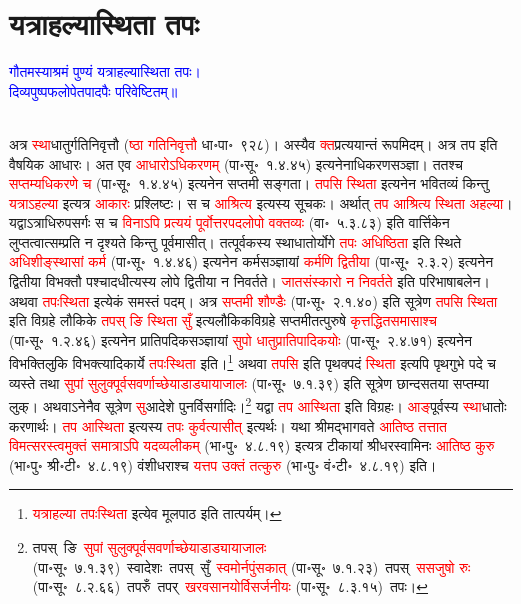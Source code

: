 \section[यत्राहल्यास्थिता तपः]{यत्राहल्यास्थिता तपः}
\centering\textcolor{blue}{गौतमस्याश्रमं पुण्यं यत्राहल्यास्थिता तपः।\nopagebreak\\
दिव्यपुष्पफलोपेतपादपैः परिवेष्टितम्॥}\nopagebreak\\
\\
\begin{sloppypar}\justifying\noindent\hspace{10mm} अत्र \textcolor{red}{स्था}\-धातुर्गति\-निवृत्तौ (\textcolor{red}{ष्ठा गति\-निवृत्तौ} धा॰पा॰~९२८)। अस्यैव \textcolor{red}{क्त}\-प्रत्ययान्तं रूपमिदम्। अत्र तप इति वैषयिक आधारः। अत एव \textcolor{red}{आधारोऽधिकरणम्‌} (पा॰सू॰~१.४.४५) इत्यनेनाधिकरण\-सञ्ज्ञा। ततश्च \textcolor{red}{सप्तम्यधिकरणे च} (पा॰सू॰~१.४.४५) इत्यनेन सप्तमी सङ्गता। \textcolor{red}{तपसि स्थिता} इत्यनेन भवितव्यं किन्तु \textcolor{red}{यत्राऽहल्या} इत्यत्र \textcolor{red}{आकारः} प्रश्लिष्टः। स च \textcolor{red}{आश्रित्य} इत्यस्य सूचकः। अर्थात् \textcolor{red}{तप आश्रित्य स्थिता अहल्या}। यद्वाऽत्राधिरुपसर्गः स च \textcolor{red}{विनाऽपि प्रत्ययं पूर्वोत्तर\-पद\-लोपो वक्तव्यः} (वा॰~५.३.८३) इति वार्त्तिकेन लुप्तत्वात्सम्प्रति न दृश्यते किन्तु पूर्वमासीत्। तत्पूर्वकस्य स्था\-धातोर्योगे \textcolor{red}{तपः अधिष्ठिता} इति स्थिते \textcolor{red}{अधिशीङ्स्थासां कर्म} (पा॰सू॰~१.४.४६) इत्यनेन कर्म\-सञ्ज्ञायां \textcolor{red}{कर्मणि द्वितीया} (पा॰सू॰~२.३.२) इत्यनेन द्वितीया विभक्तौ पश्चादधीत्यस्य लोपे द्वितीया न निवर्तते। \textcolor{red}{जात\-संस्कारो न निवर्तते} इति परिभाषा\-बलेन। अथवा \textcolor{red}{तपःस्थिता} इत्येकं समस्तं पदम्। अत्र \textcolor{red}{सप्तमी शौण्डैः} (पा॰सू॰~२.१.४०) इति सूत्रेण \textcolor{red}{तपसि स्थिता} इति विग्रहे लौकिके \textcolor{red}{तपस् ङि स्थिता सुँ} इत्यलौकिक\-विग्रहे सप्तमी\-तत्पुरुषे \textcolor{red}{कृत्तद्धित\-समासाश्च} (पा॰सू॰~१.२.४६) इत्यनेन प्रातिपदिक\-सञ्ज्ञायां \textcolor{red}{सुपो धातु\-प्रातिपादिकयोः} (पा॰सू॰~२.४.७१) इत्यनेन विभक्ति\-लुकि विभक्त्यादि\-कार्ये \textcolor{red}{तपःस्थिता} इति।\footnote{\textcolor{red}{यत्राहल्या तपःस्थिता} इत्येव मूलपाठ इति तात्पर्यम्।} अथवा \textcolor{red}{तपसि} इति पृथक्पदं \textcolor{red}{स्थिता} इत्यपि पृथगुभे पदे च व्यस्ते तथा \textcolor{red}{सुपां सुलुक्पूर्व\-सवर्णाच्छेयाडाड्यायाजालः} (पा॰सू॰~७.१.३९) इति सूत्रेण छान्दसतया सप्तम्या लुक्। अथवाऽनेनैव सूत्रेण \textcolor{red}{सु}आदेशे पुनर्विसर्गादिः।\footnote{तपस्~ङि~\arrow \textcolor{red}{सुपां सुलुक्पूर्व\-सवर्णाच्छेयाडाड्यायाजालः} (पा॰सू॰~७.१.३९)~\arrow स्वादेशः~\arrow तपस्~सुँ~\arrow \textcolor{red}{स्वमोर्नपुंसकात्} (पा॰सू॰~७.१.२३)~\arrow तपस्~\arrow \textcolor{red}{ससजुषो रुः} (पा॰सू॰~८.२.६६)~\arrow तपरुँ~\arrow तपर्~\arrow \textcolor{red}{खरवसानयोर्विसर्जनीयः} (पा॰सू॰~८.३.१५)~\arrow तपः।} यद्वा \textcolor{red}{तप आस्थिता} इति विग्रहः। \textcolor{red}{आङ्‌}\-पूर्वस्य \textcolor{red}{स्था}\-धातोः करणार्थः। \textcolor{red}{तप आस्थिता} इत्यस्य \textcolor{red}{तपः कुर्वत्यासीत्‌} इत्यर्थः। यथा श्रीमद्भागवते \textcolor{red}{आतिष्ठ तत्तात विमत्सरस्त्वमुक्तं समात्राऽपि यदव्यलीकम्‌} (भा॰पु॰~४.८.१९) इत्यत्र टीकायां श्रीधर\-स्वामिनः \textcolor{red}{आतिष्ठ कुरु} (भा॰पु॰ श्री॰टी॰~४.८.१९) वंशीधराश्च \textcolor{red}{यत्तप उक्तं तत्कुरु} (भा॰पु॰ वं॰टी॰~४.८.१९) इति। \end{sloppypar}
